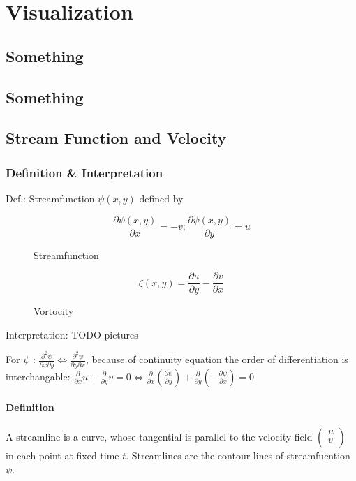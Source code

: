 \section{Visualization}

\subsection{Something}
\subsection{Something}

\subsection{Stream Function and Velocity}

\subsubsection{Definition \& Interpretation}

Def.: Streamfunction $\psi(x,y)$ defined by
\begin{figure}[H]
	\centering
   \[\frac{\partial \psi(x,y)}{\partial x} = -v ; \frac{\partial \psi(x,y)}{\partial y} = u \]
    \renewcommand{\thefigure}{4.4}
	\caption{Streamfunction}
\end{figure}

\begin{figure}[H]
	\centering
   \[ \zeta (x,y) = \frac{\partial u}{\partial y} - \frac{\partial v}{\partial x} \]
    \renewcommand{\thefigure}{4.5}
	\caption{Vortocity}
\end{figure}

Interpretation: TODO pictures

For $\psi$ : $ \frac{\partial^2 \psi}{\partial x \partial y} \Leftrightarrow \frac{\partial^2 \psi}{\partial y \partial x}$, because of continuity equation the order of differentiation is interchangable: $\frac{\partial}{\partial x}u + \frac{\partial}{\partial y}v = 0 \Leftrightarrow \frac{\partial}{\partial x}\left(\frac{\partial \psi}{\partial y}\right) + \frac{\partial}{\partial y}\left(-\frac{\partial \psi}{\partial x}\right) = 0$

\paragraph{Definition}
A streamline is a curve, whose tangential is parallel to the velocity field $\begin{pmatrix}u\\v\\\end{pmatrix}$ in each point at fixed time $t$. Streamlines are the contour lines of streamfucntion $\psi$.


